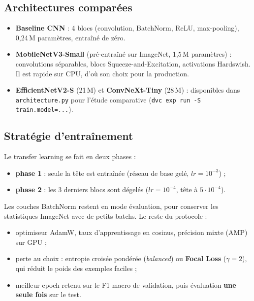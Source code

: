 \documentclass[11pt,a4paper]{article}
\begin{document}
\subsection{Architectures comparées}
\begin{itemize}
  \item \textbf{Baseline CNN} : 4 blocs (convolution, BatchNorm, ReLU, max-pooling), 0,24\,M paramètres, entraîné de zéro.
  \item \textbf{MobileNetV3-Small} (pré-entraîné sur ImageNet, 1,5\,M paramètres) : convolutions séparables, blocs Squeeze-and-Excitation, activations Hardswish. Il est rapide sur CPU, d'où son choix pour la production.
  \item \textbf{EfficientNetV2-S} (21\,M) et \textbf{ConvNeXt-Tiny} (28\,M) : disponibles dans \texttt{architecture.py} pour l'étude comparative (\texttt{dvc exp run -S train.model=...}).
\end{itemize}

\subsection{Stratégie d'entraînement}
Le transfer learning se fait en deux phases :
\begin{itemize}
  \item \textbf{phase 1} : seule la tête est entraînée (réseau de base gelé, $lr=10^{-3}$) ;
  \item \textbf{phase 2} : les 3 derniers blocs sont dégelés ($lr=10^{-4}$, tête à $5\cdot10^{-4}$).
\end{itemize}
Les couches BatchNorm restent en mode évaluation, pour conserver les statistiques ImageNet avec de petits batchs. Le reste du protocole :
\begin{itemize}
  \item optimiseur AdamW, taux d'apprentissage en cosinus, précision mixte (AMP) sur GPU ;
  \item perte au choix : entropie croisée pondérée (\emph{balanced}) ou \textbf{Focal Loss} ($\gamma=2$), qui réduit le poids des exemples faciles ;
  \item meilleur epoch retenu sur le F1 macro de validation, puis évaluation \textbf{une seule fois} sur le test.
\end{itemize}
\end{document}
